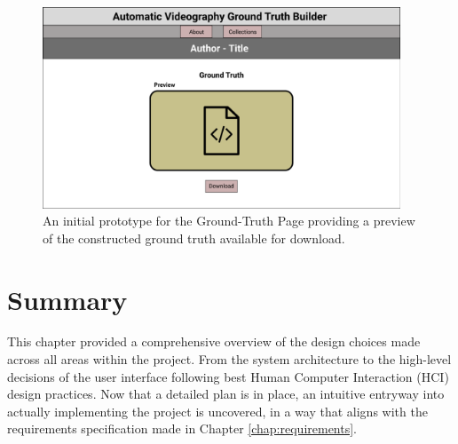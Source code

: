 \documentclass{l4proj}
\begin{document}
\begin{figure}[H]
    \centering
    \includegraphics[width=0.95\textwidth]{figures/ground_truth_page.pdf}
    \caption{An initial prototype for the Ground-Truth Page providing a preview of the constructed ground truth available for download.}
    \label{fig:ground_truth_page}
\end{figure}


\section{Summary}
This chapter provided a comprehensive overview of the design choices made across all areas within the project. From the system architecture to the high-level decisions of the user interface following best Human Computer Interaction (HCI) design practices. Now that a detailed plan is in place, an intuitive entryway into actually implementing the project is uncovered, in a way that aligns with the requirements specification made in Chapter \ref{chap:requirements}. 



\end{document}
